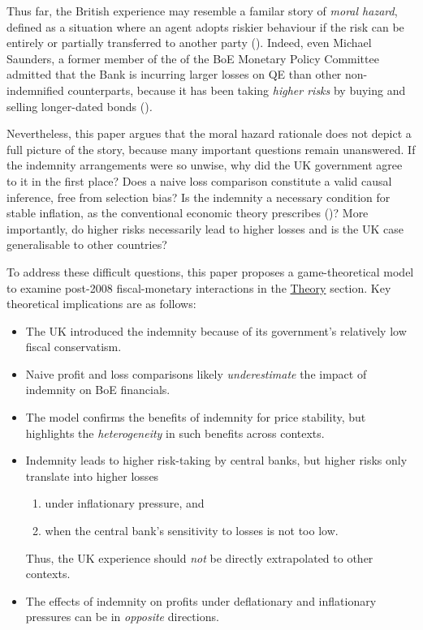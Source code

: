 \documentclass[
  a4paper,
  abstract=true]{scrartcl}
\theoremstyle{definition}
\begin{document}
Thus far, the British experience may resemble a familar story of
\emph{moral hazard}, defined as a situation where an agent adopts
riskier behaviour if the risk can be entirely or partially transferred
to another party (). Indeed, even
Michael Saunders, a former member of the of the BoE Monetary Policy
Committee admitted that the Bank is incurring larger losses on QE than
other non-indemnified counterparts, because it has been taking
\emph{higher risks} by buying and selling longer-dated bonds
()\emph{.}

Nevertheless, this paper argues that the moral hazard rationale does not
depict a full picture of the story, because many important questions
remain unanswered. If the indemnity arrangements were so unwise, why did
the UK government agree to it in the first place? Does a naive loss
comparison constitute a valid causal inference, free from selection
bias? Is the indemnity a necessary condition for stable inflation, as
the conventional economic theory prescribes
()? More importantly, do
higher risks necessarily lead to higher losses and is the UK case
generalisable to other countries?

To address these difficult questions, this paper proposes a
game-theoretical model to examine post-2008 fiscal-monetary interactions
in the \hyperref[sec-theory]{Theory} section. Key theoretical
implications are as follows:

\begin{itemize}
\item
  The UK introduced the indemnity because of its government's relatively
  low fiscal conservatism.
\item
  Naive profit and loss comparisons likely \emph{underestimate} the
  impact of indemnity on BoE financials.
\item
  The model confirms the benefits of indemnity for price stability, but
  highlights the \emph{heterogeneity} in such benefits across contexts.
\item
  Indemnity leads to higher risk-taking by central banks, but higher
  risks only translate into higher losses

  \begin{enumerate}
  \def\labelenumi{\arabic{enumi}.}
  \item
    under inflationary pressure, and
  \item
    when the central bank's sensitivity to losses is not too low.
  \end{enumerate}

  Thus, the UK experience should \emph{not} be directly extrapolated to
  other contexts.
\item
  The effects of indemnity on profits under deflationary and
  inflationary pressures can be in \emph{opposite} directions.
\end{itemize}
\end{document}
